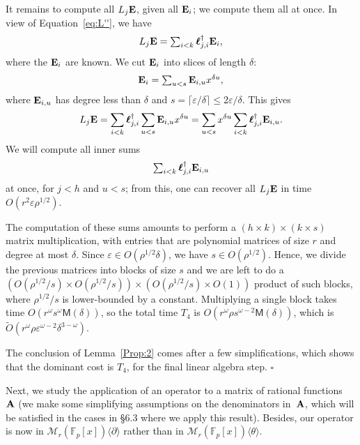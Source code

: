 \documentclass{sig-alternate}
\def\bell{\mbox{\boldmath$\ell$}}
\newcommand{\bigOsoft}{\tilde{O}}
\def\F {\mathbb{F}}
\def\M{\ensuremath{\mathsf{M}}}
\def\mA {\ensuremath{{\bf A}}}
\def\mE {\ensuremath{{\bf E}}}
\def\foorp{\hfill$\square$}
\begin{document}
It remains to compute all $L_j \mE$, given all $\mE_i$; we compute
them all at once. In view of Equation~\eqref{eq:L''}, we have
$$\begin{array}{c}L_j \mE=\sum_{i < k}  \bell^\dagger_{j,i} \mE_i,\end{array}$$
where the $\mE_i$ are known. We cut $\mE_i$ into slices of length $\delta$:
$$\begin{array}{c}\mE_i = \sum_{u < s} \mE_{i,u} x^{\delta u},\end{array}$$ 
where $\mE_{i,u}$ has degree less than $\delta$ and $s =\lceil
\varepsilon/\delta \rceil \le 2\varepsilon/\delta$. This gives
$$L_j \mE = \sum_{i < k}  \bell^\dagger_{j,i} \sum_{u < s} \mE_{i,u}x^{\delta u}
= \sum_{u < s} x^{\delta u}  \sum_{i < k}\bell^\dagger_{j,i} \mE_{i,u}.$$
We will compute all inner sums
$$\begin{array}{c}\sum_{i < k} \bell^\dagger_{j,i} \mE_{i,u}\end{array}$$
at once, for $j < h$ and $u < s$; from this, one can recover all
$L_j\mE$ in time $O(r^2 \varepsilon \rho^{1/2})$.

The computation of these sums amounts to perform a $(h\times k) \times
(k\times s)$ matrix multiplication, with entries that are polynomial
matrices of size $r$ and degree at most $\delta$.  Since $\varepsilon
\in O(\rho^{1/2}\delta)$, we have $s \in O(\rho^{1/2})$. Hence, we
divide the previous matrices into blocks of size $s$ and we are left
to do a $(O(\rho^{1/2}/s) \times O(\rho^{1/2}/s)) \times
(O(\rho^{1/2}/s)\times O(1))$ product of such blocks, where
$\rho^{1/2}/s$ is lower-bounded by a constant.  Multiplying a single
block takes time $O(r^\omega s^\omega \M(\delta))$, so the total time
$T_4$ is $O(r^\omega \rho s^{\omega-2}\M(\delta))$, which is 
$\bigOsoft(r^\omega \rho \varepsilon^{\omega-2} \delta^{3-\omega})$.

The conclusion of Lemma~\ref{Prop:2} comes after a few
simplifications, which shows that the dominant cost is $T_4$, for the
final linear algebra step. \foorp

\smallskip{} Next, we study
the application of an operator to a matrix of rational functions~$\mA$
(we make some simplifying assumptions on the denominators in~$\mA$,
which will be satisfied in the cases in \S 6.3 where we apply this
result). Besides, our operator is now in
$\mathscr{M}_r(\F_p[x])\langle \partial \rangle$ rather than in
$\mathscr{M}_r(\F_p[x])\langle \theta \rangle$.
\end{document}
